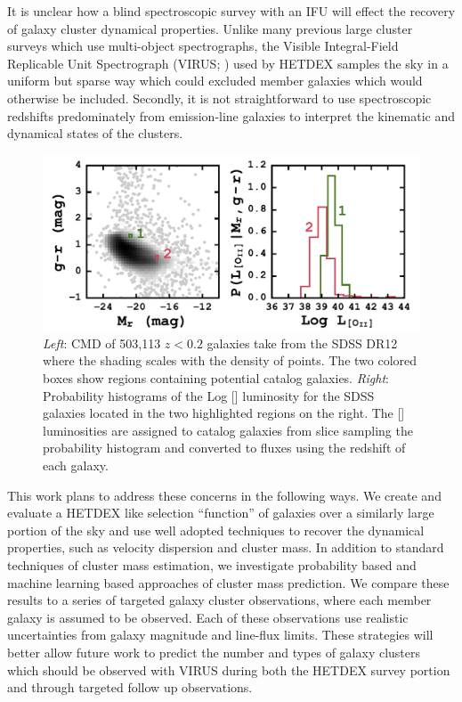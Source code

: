 It is unclear how a blind spectroscopic survey with an IFU will effect the recovery of galaxy cluster dynamical properties. Unlike many previous large cluster surveys  which use multi-object spectrographs, the Visible Integral-Field Replicable Unit Spectrograph (VIRUS; \citealt{Hill2012}) used by HETDEX samples the sky in a uniform but sparse way which could excluded member galaxies which would otherwise be included. Secondly, it is not straightforward to use spectroscopic redshifts predominately from emission-line galaxies to interpret the kinematic and dynamical states of the clusters.

\begin{figure}
	\begin{centering}
		\includegraphics[width=\textwidth]{figures1/oii_sdss.pdf} 
	\end{centering}
	\caption[Illustration of the probability based \hbox{[]} flux prediction method.]{\textit{Left}: CMD of 503,113 $z<0.2$ galaxies take from the SDSS DR12 where the shading scales with the density of points. The two colored boxes show regions containing potential catalog galaxies. \textit{Right}: Probability histograms of the Log [] luminosity for the SDSS galaxies located in the two highlighted regions on the right. The [] luminosities are assigned to catalog galaxies from slice sampling the probability histogram and converted to fluxes using the redshift of each galaxy.}
	\label{fig: oii sdss} 
\end{figure}

This work plans to address these concerns in the following ways. We create and evaluate a HETDEX like selection ``function'' of galaxies over a similarly large portion of the sky and use well adopted techniques to recover the dynamical properties, such as velocity dispersion and cluster mass. In addition to standard techniques of cluster mass estimation, we investigate probability based and machine learning based approaches of cluster mass prediction. We compare these results to a series of targeted galaxy cluster observations, where each member galaxy is assumed to be observed. Each of these observations use realistic uncertainties from galaxy magnitude and line-flux limits. These strategies will better allow future work to predict the number and types of galaxy clusters which should be observed with VIRUS during both the HETDEX survey portion and through targeted follow up observations.

